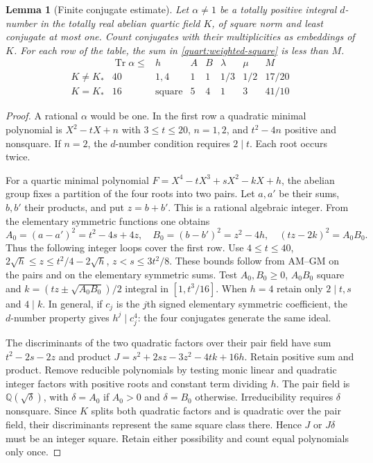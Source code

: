 \documentclass[11pt,a4paper]{article}
\newtheorem{lemma}[theorem]{Lemma}
\theoremstyle{definition}\newtheorem{definition}[theorem]{Definition}
\theoremstyle{remark}\newtheorem{remark}[theorem]{Remark}
\DeclareMathOperator{\Tr}{Tr}
\newcommand{\Q}{\mathbb Q}
\numberwithin{equation}{section}
\begin{document}
\begin{lemma}[Finite conjugate estimate]\label{quart:arithmetic}
Let $\alpha\ne1$ be a totally positive integral $d$-number in the
totally real abelian quartic field $K$, of square norm and least conjugate
at most one. Count conjugates with their multiplicities as embeddings
of $K$. For each row of the table, the sum in
\eqref{quart:weighted-square} is less than $M$.
\[
\begin{array}{c|cc|cccc|c}
 &\Tr\alpha\le& h&A&B&\lambda&\mu&M\\\hline
 K\ne K_* &40&1,4&1&1&1/3&1/2&17/20\\
 K=K_* &16&\text{square}&5&4&1&3&41/10
\end{array}
\]
\end{lemma}
\begin{proof}
A rational $\alpha$ would be one. In the first row a quadratic minimal
polynomial is $X^2-tX+n$ with $3\le t\le20$, $n=1,2$, and
$t^2-4n$ positive and nonsquare. If $n=2$, the $d$-number condition
requires $2\mid t$. Each root occurs twice.

For a quartic minimal polynomial $F=X^4-tX^3+sX^2-kX+h$, the
abelian group fixes a partition of the four roots into two pairs.
Let $a,a'$ be their sums, $b,b'$ their products, and put $z=b+b'$.
This is a rational algebraic integer. From the elementary symmetric
functions one obtains
\[
 A_0=(a-a')^2=t^2-4s+4z,\quad B_0=(b-b')^2=z^2-4h,\quad
 (tz-2k)^2=A_0B_0.
\]
Thus the following integer loops cover the first row. Use $4\le t\le40$,
$2\sqrt h\le z\le t^2/4-2\sqrt h$,
$z<s\le3t^2/8$. These bounds follow from AM--GM on the pairs and on
the elementary symmetric sums. Test $A_0,B_0\ge0$, $A_0B_0$ square
and $k=(tz\pm\sqrt{A_0B_0})/2$ integral in $[1,t^3/16]$.
When $h=4$ retain only $2\mid t,s$ and $4\mid k$.
In general, if $c_j$ is the $j$th signed elementary symmetric
coefficient, the $d$-number property gives $h^j\mid c_j^4$:
the four conjugates generate the same ideal.

The discriminants of the two quadratic factors over their pair field
have sum $t^2-2s-2z$ and product
$J=s^2+2sz-3z^2-4tk+16h$. Retain positive sum and product.
Remove reducible polynomials by testing monic linear and quadratic
integer factors with positive roots and constant term dividing $h$.
The pair field is $\Q(\sqrt\delta)$, with $\delta=A_0$ if $A_0>0$ and
$\delta=B_0$ otherwise. Irreducibility requires $\delta$ nonsquare.
Since $K$ splits both quadratic factors and is quadratic over the pair
field, their discriminants represent the same square class there.
Hence $J$ or $J\delta$ must be an integer square. Retain either
possibility and count equal polynomials only once.


\end{proof}
\end{document}
